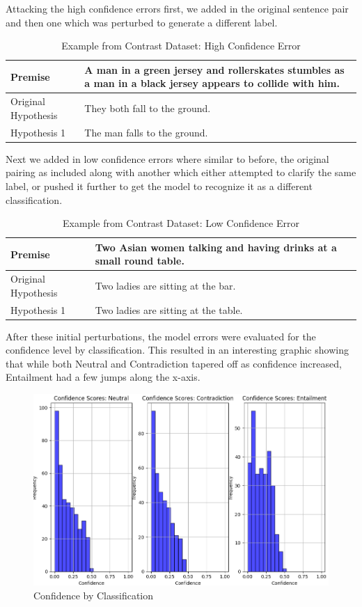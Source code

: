 \documentclass[11pt]{article}
\begin{document}
Attacking the high confidence errors first, we added in the original sentence pair and then one which was perturbed to generate a different label.
\begin{table}[h!]
    \centering
    \begin{tabularx}{0.45\textwidth} { 
  | >{\raggedright\arraybackslash}X 
  | >{\raggedright\arraybackslash}X | }
    \hline
        Premise & A man in a green jersey and rollerskates stumbles as a man in a black jersey appears to collide with him.\\
        \hline
        Original Hypothesis & They both fall to the ground.\\
        \hline
        Hypothesis 1 & The man falls to the ground.\\
        \hline
    \end{tabularx}
    \caption{Example from Contrast Dataset: High Confidence Error}
    \label{tab:Annot1}
\end{table}

Next we added in low confidence errors where similar to before, the original pairing as included along with another which either attempted to clarify the same label, or pushed it further to get the model to recognize it as a different classification.
\begin{table}[h!]
    \centering
    \begin{tabularx}{0.45\textwidth} { 
  | >{\raggedright\arraybackslash}X 
  | >{\raggedright\arraybackslash}X | }
    \hline
        Premise & Two Asian women talking and having drinks at a small round table.\\
        \hline
        Original Hypothesis & Two ladies are sitting at the bar.\\
        \hline
        Hypothesis 1 & Two ladies are sitting at the table.\\
        \hline
    \end{tabularx}
    \caption{Example from Contrast Dataset: Low Confidence Error}
    \label{tab:Annot1}
\end{table}

After these initial perturbations, the model errors were evaluated for the confidence level by classification. This resulted in an interesting graphic showing that while both Neutral and Contradiction tapered off as confidence increased, Entailment had a few jumps along the x-axis.

\begin{figure}[h!]
    \centering
    \includegraphics[width=0.5\linewidth]{FigureConfidenceByClass.png}
    \caption{Confidence by Classification}
    \label{fig:Confidence1}
\end{figure}
\end{document}
